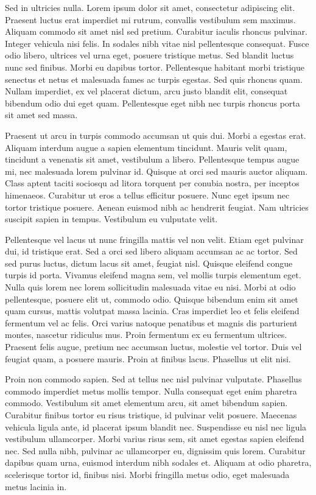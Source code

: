 Sed in ultricies nulla. Lorem ipsum dolor sit amet, consectetur adipiscing elit. Praesent luctus erat imperdiet mi rutrum, convallis vestibulum sem maximus. Aliquam commodo sit amet nisl sed pretium. Curabitur iaculis rhoncus pulvinar. Integer vehicula nisi felis. In sodales nibh vitae nisl pellentesque consequat. Fusce odio libero, ultrices vel urna eget, posuere tristique metus. Sed blandit luctus nunc sed finibus. Morbi eu dapibus tortor. Pellentesque habitant morbi tristique senectus et netus et malesuada fames ac turpis egestas. Sed quis rhoncus quam. Nullam imperdiet, ex vel placerat dictum, arcu justo blandit elit, consequat bibendum odio dui eget quam. Pellentesque eget nibh nec turpis rhoncus porta sit amet sed massa.

Praesent ut arcu in turpis commodo accumsan ut quis dui. Morbi a egestas erat. Aliquam interdum augue a sapien elementum tincidunt. Mauris velit quam, tincidunt a venenatis sit amet, vestibulum a libero. Pellentesque tempus augue mi, nec malesuada lorem pulvinar id. Quisque at orci sed mauris auctor aliquam. Class aptent taciti sociosqu ad litora torquent per conubia nostra, per inceptos himenaeos. Curabitur ut eros a tellus efficitur posuere. Nunc eget ipsum nec tortor tristique posuere. Aenean euismod nibh ac hendrerit feugiat. Nam ultricies suscipit sapien in tempus. Vestibulum eu vulputate velit.

Pellentesque vel lacus ut nunc fringilla mattis vel non velit. Etiam eget pulvinar dui, id tristique erat. Sed a orci sed libero aliquam accumsan ac ac tortor. Sed sed purus luctus, dictum lacus sit amet, feugiat nisl. Quisque eleifend congue turpis id porta. Vivamus eleifend magna sem, vel mollis turpis elementum eget. Nulla quis lorem nec lorem sollicitudin malesuada vitae eu nisi. Morbi at odio pellentesque, posuere elit ut, commodo odio. Quisque bibendum enim sit amet quam cursus, mattis volutpat massa lacinia. Cras imperdiet leo et felis eleifend fermentum vel ac felis. Orci varius natoque penatibus et magnis dis parturient montes, nascetur ridiculus mus. Proin fermentum ex eu fermentum ultrices. Praesent felis augue, pretium nec accumsan luctus, molestie vel tortor. Duis vel feugiat quam, a posuere mauris. Proin at finibus lacus. Phasellus ut elit nisi.

Proin non commodo sapien. Sed at tellus nec nisl pulvinar vulputate. Phasellus commodo imperdiet metus mollis tempor. Nulla consequat eget enim pharetra commodo. Vestibulum sit amet elementum arcu, sit amet bibendum sapien. Curabitur finibus tortor eu risus tristique, id pulvinar velit posuere. Maecenas vehicula ligula ante, id placerat ipsum blandit nec. Suspendisse eu nisl nec ligula vestibulum ullamcorper. Morbi varius risus sem, sit amet egestas sapien eleifend nec. Sed nulla nibh, pulvinar ac ullamcorper eu, dignissim quis lorem. Curabitur dapibus quam urna, euismod interdum nibh sodales et. Aliquam at odio pharetra, scelerisque tortor id, finibus nisi. Morbi fringilla metus odio, eget malesuada metus lacinia in.

